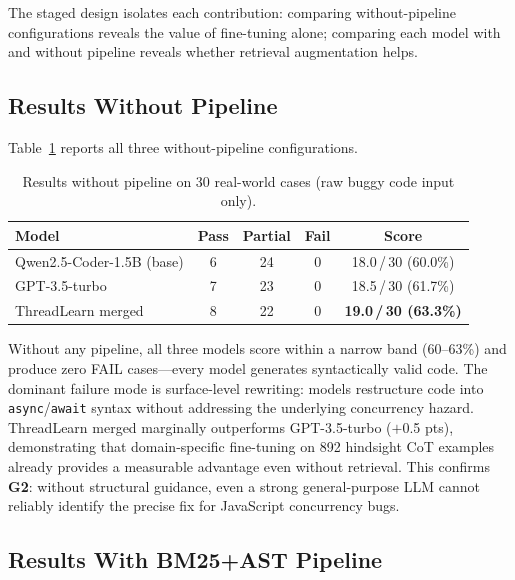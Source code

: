 \documentclass[runningheads]{llncs}
\begin{document}
The staged design isolates each contribution: comparing without-pipeline
configurations reveals the value of fine-tuning alone; comparing each model
with and without pipeline reveals whether retrieval augmentation helps.

\subsection{Results Without Pipeline}
\label{sec:eval:nopipeline}

Table~\ref{tab:nopipeline} reports all three without-pipeline configurations.

\begin{table}[H]
  \centering
  \vspace{-0.3cm}
  \caption{Results without pipeline on 30 real-world cases (raw buggy code input only).}
  \label{tab:nopipeline}
  \begin{tabular}{@{}lcccc@{}}
    \toprule
    \textbf{Model} & \textbf{Pass} & \textbf{Partial} & \textbf{Fail} & \textbf{Score} \\
    \midrule
    Qwen2.5-Coder-1.5B (base)  & 6  & 24 & 0 & 18.0\,/\,30 (60.0\%) \\
    GPT-3.5-turbo               & 7  & 23 & 0 & 18.5\,/\,30 (61.7\%) \\
    ThreadLearn merged          & 8  & 22 & 0 & \textbf{19.0\,/\,30 (63.3\%)} \\
    \bottomrule
  \end{tabular}
\end{table}

Without any pipeline, all three models score within a narrow band
(60--63\%) and produce zero FAIL cases---every model generates syntactically
valid code.
The dominant failure mode is surface-level rewriting: models restructure
code into \texttt{async}/\texttt{await} syntax without addressing the
underlying concurrency hazard.
ThreadLearn merged marginally outperforms GPT-3.5-turbo ($+$0.5 pts), demonstrating
that domain-specific fine-tuning on 892 hindsight CoT examples already
provides a measurable advantage even without retrieval.
This confirms \textbf{G2}: without structural guidance, even a strong
general-purpose LLM cannot reliably identify the precise fix for
JavaScript concurrency bugs.

\subsection{Results With BM25+AST Pipeline}
\label{sec:eval:pipeline}
\end{document}
